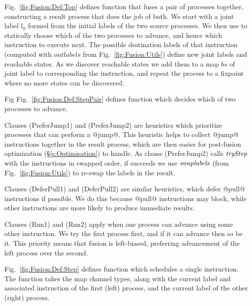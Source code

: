 



\smallskip
Fig.~\ref{fig:Fusion:Def:Top} defines function  that fuses a pair of processes together, constructing a result process that does the job of both. We start with a joint label $l_0$ formed from the initial labels of the two source processes. We then use  to statically choose which of the two processes to advance, and hence which instruction to execute next. The possible destination labels of that instruction (computed with $outlabels$ from Fig.~\ref{fig:Fusion:Utils}) define new joint labels and reachable states. As we discover reachable states we add them to a map $bs$ of joint label to corresponding the instruction, and repeat the process to a fixpoint where no more states can be discovered.



\eject{}
Fig Fig.~\ref{fig:Fusion:Def:StepPair} defines function  which decides which of two processes to advance.

Clauses (PreferJump1) and (PreferJump2) are heuristics which prioritize processes that can perform a @jump@. This heuristic helps to collect @jump@ instructions together in the result process, which are then easier for post-fusion optimization (\S\ref{s:Optimisation}) to handle. As clause (PreferJump2) calls $\textit{tryStep}$ with the instructions in swapped order, if  succeeds we use $\textit{swaplabels}$ (from Fig.~\ref{fig:Fusion:Utils}) to re-swap the labels in the result.

Clauses (DeferPull1) and (DeferPull2) are similar heuristics, which defer @pull@ instructions if possible. We do this because @pull@ instructions may block, while other instructions are more likely to produce immediate results.

Clauses (Run1) and (Run2) apply when one process can advance using some other instruction. We try the first process first, and if it can advance then so be it. This priority means that fusion is left-biased, preferring advancement of the left process over the second.




\smallskip
Fig.~\ref{fig:Fusion:Def:Step} defines function  which schedules a single instruction. The  function takes the map channel types, along with the current label and associated instruction of the first (left) process, and the current label of the other (right) process.

